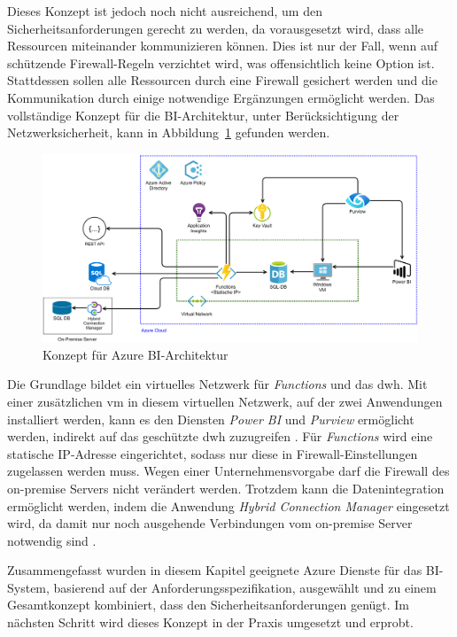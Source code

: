 Dieses Konzept ist jedoch noch nicht ausreichend, um den Sicherheitsanforderungen gerecht zu werden, da vorausgesetzt wird, dass alle Ressourcen miteinander kommunizieren können. Dies ist nur der Fall, wenn auf schützende Firewall-Regeln verzichtet wird, was offensichtlich keine Option ist. Stattdessen sollen alle Ressourcen durch eine Firewall gesichert werden und die Kommunikation durch einige notwendige Ergänzungen ermöglicht werden. Das vollständige Konzept für die BI-Architektur, unter Berücksichtigung der Netzwerksicherheit, kann in Abbildung~\ref{fig:chap03_4_konzeptArchitektur} gefunden werden.
 
 \begin{figure}[htbp]
 \centering
 \includegraphics[width=\textwidth]{gfx/konzept_2.png}
 \caption{Konzept für Azure BI-Architektur}
\label{fig:chap03_4_konzeptArchitektur}
\end{figure}

Die Grundlage bildet ein virtuelles Netzwerk für \textit{Functions} und das \ac{dwh}. Mit einer zusätzlichen \ac{vm} in diesem virtuellen Netzwerk, auf der zwei Anwendungen installiert werden, kann es den Diensten \textit{Power BI} und \textit{Purview} ermöglicht werden, indirekt auf das geschützte \ac{dwh} zuzugreifen \cite[vgl.][]{gunnarsson_pro_2020, msdoc_22_purviewSHIR}. Für \textit{Functions} wird eine statische IP-Adresse eingerichtet, sodass nur diese in Firewall-Einstellungen zugelassen werden muss. Wegen einer Unternehmensvorgabe darf die Firewall des on-premise Servers nicht verändert werden. Trotzdem kann die Datenintegration ermöglicht werden, indem die Anwendung \textit{Hybrid Connection Manager} eingesetzt wird,  da damit nur noch ausgehende Verbindungen vom on-premise Server notwendig sind \cite[vgl.][]{msdoc_22_func_hybridConn}.

Zusammengefasst wurden in diesem Kapitel geeignete Azure Dienste für das BI-System, basierend auf der Anforderungsspezifikation, ausgewählt und zu einem Gesamtkonzept kombiniert, dass den Sicherheitsanforderungen genügt. Im nächsten Schritt wird dieses Konzept in der Praxis umgesetzt und erprobt.